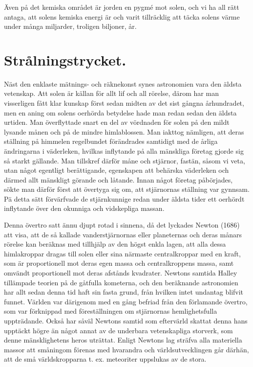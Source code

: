 \documentclass[a4paper, 12pt, oneside, swedish]{article}
\begin{document}
Även på det kemiska området är jorden en pygmé mot solen, och vi ha all rätt antaga, att solens kemiska energi är och varit tillräcklig att täcka solens värme under många miljarder, troligen biljoner, år.
\clearpage
\section{Strålningstrycket.}
\paragraph{}
Näst den enklaste mätnings- och räknekonst synes astronomien vara den äldsta vetenskap. Att solen är källan för allt lif och all rörelse, därom har man visserligen fått klar kunskap först sedan midten av det sist gångna århundradet, men en aning om solens oerhörda betydelse hade man redan sedan den äldsta urtiden. Man överflyttade snart en del av vördnaden för solen på den mildt lysande månen och på de mindre himlablossen. Man iakttog nämligen, att deras ställning på himmelen regelbundet förändrades samtidigt med de årliga ändringarna i väderleken, hvilkas inflytande på alla mänskliga företag gjorde sig så starkt gällande. Man tillskref därför måne och stjärnor, fastän, såsom vi veta, utan något egentligt berättigande, egenskapen att behärska väderleken och därmed allt mänskligt görande och låtande. Innan något företag påbörjades, sökte man därför först att övertyga sig om, att stjärnornas ställning var gynnsam. Pä detta sätt förvärfvade de stjärnkunnige redan under äldsta tider ett oerhördt inflytande över den okunniga och vidskepliga massan.

Denna övertro satt ännu djupt rotad i sinnena, då det lyckades Newton (1686) att visa, att de så kallade vanderstjärnornas eller planeternas och deras månars rörelse kan beräknas med tillhjälp av den högst enkla lagen, att alla dessa himlakroppar dragas till solen eller sina närmaste centralkroppar med en kraft, som är proportionell mot deras egen massa och centralkroppens massa, samt omvändt proportionell mot deras afstånds kvadrater. Newtons samtida Halley tillämpade teorien på de gåtfulla kometerna, och den beräknande astronomien har allt sedan denna tid haft sin fasta grund, från hvilken intet undantag blifvit funnet. Världen var därigenom med en gång befriad från den förlamande övertro, som var förknippad med föreställningen om stjärnornas hemlighetsfulla uppträdande. Också har såväl Newtons samtid som eftervärld skattat denna hans upptäckt högre än något annat av de underbara vetenskapliga storverk, som denne mänsklighetens heros uträttat. Enligt Newtons lag sträfva alla materiella massor att småningom förenas med hvarandra och världsutvecklingen går därhän, att de små världskropparna t. ex. meteoriter uppslukas av de stora.
\end{document}
